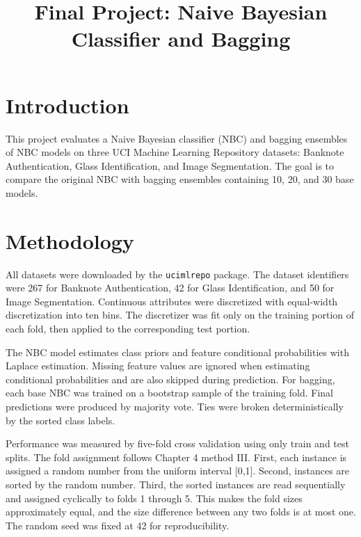 \documentclass[11pt]{article}
\title{Final Project: Naive Bayesian Classifier and Bagging}
\author{}
\date{}
\begin{document}
\maketitle

\section{Introduction}
This project evaluates a Naive Bayesian classifier (NBC) and bagging ensembles of NBC models on three UCI Machine Learning Repository datasets: Banknote Authentication, Glass Identification, and Image Segmentation. The goal is to compare the original NBC with bagging ensembles containing 10, 20, and 30 base models.

\section{Methodology}
All datasets were downloaded by the \texttt{ucimlrepo} package. The dataset identifiers were 267 for Banknote Authentication, 42 for Glass Identification, and 50 for Image Segmentation. Continuous attributes were discretized with equal-width discretization into ten bins. The discretizer was fit only on the training portion of each fold, then applied to the corresponding test portion.

The NBC model estimates class priors and feature conditional probabilities with Laplace estimation. Missing feature values are ignored when estimating conditional probabilities and are also skipped during prediction. For bagging, each base NBC was trained on a bootstrap sample of the training fold. Final predictions were produced by majority vote. Ties were broken deterministically by the sorted class labels.

Performance was measured by five-fold cross validation using only train and test splits. The fold assignment follows Chapter 4 method III. First, each instance is assigned a random number from the uniform interval [0,1]. Second, instances are sorted by the random number. Third, the sorted instances are read sequentially and assigned cyclically to folds 1 through 5. This makes the fold sizes approximately equal, and the size difference between any two folds is at most one. The random seed was fixed at 42 for reproducibility.
\end{document}
